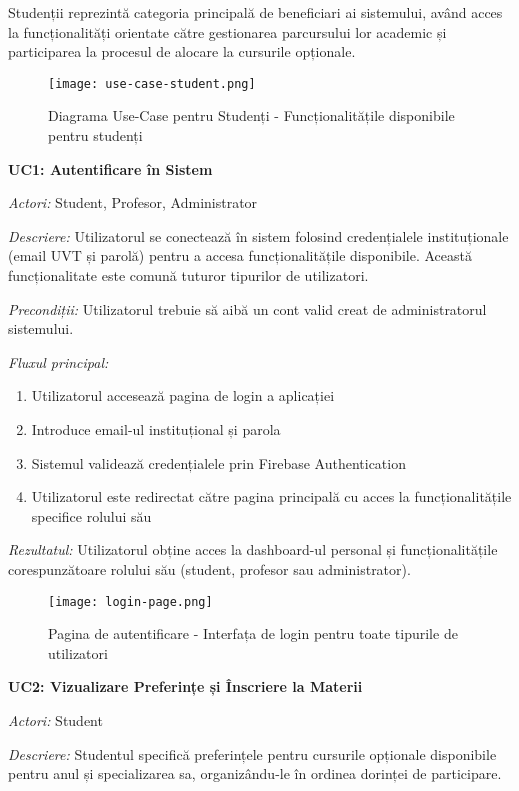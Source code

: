 \documentclass[12pt,a4paper]{report}
\begin{document}
Studenții reprezintă categoria principală de beneficiari ai sistemului, având acces la funcționalități orientate către gestionarea parcursului lor academic și participarea la procesul de alocare la cursurile opționale.

\begin{figure}[H]
\centering
\texttt{[image: use-case-student.png]}
\caption{Diagrama Use-Case pentru Studenți - Funcționalitățile disponibile pentru studenți}
\label{fig:use-case-student}
\end{figure}

\textbf{UC1: Autentificare în Sistem}

\textit{Actori:} Student, Profesor, Administrator

\textit{Descriere:} Utilizatorul se conectează în sistem folosind credențialele instituționale (email UVT și parolă) pentru a accesa funcționalitățile disponibile. Această funcționalitate este comună tuturor tipurilor de utilizatori.

\textit{Precondiții:} Utilizatorul trebuie să aibă un cont valid creat de administratorul sistemului.

\textit{Fluxul principal:}
\begin{enumerate}
\item Utilizatorul accesează pagina de login a aplicației
\item Introduce email-ul instituțional și parola
\item Sistemul validează credențialele prin Firebase Authentication
\item Utilizatorul este redirectat către pagina principală cu acces la funcționalitățile specifice rolului său
\end{enumerate}

\textit{Rezultatul:} Utilizatorul obține acces la dashboard-ul personal și funcționalitățile corespunzătoare rolului său (student, profesor sau administrator).

\begin{figure}[H]
\centering
\texttt{[image: login-page.png]}
\caption{Pagina de autentificare - Interfața de login pentru toate tipurile de utilizatori}
\label{fig:login-page}
\end{figure}

\textbf{UC2: Vizualizare Preferințe și Înscriere la Materii}

\textit{Actori:} Student

\textit{Descriere:} Studentul specifică preferințele pentru cursurile opționale disponibile pentru anul și specializarea sa, organizându-le în ordinea dorinței de participare.
\end{document}

